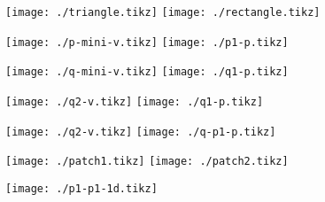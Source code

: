 \documentclass{article}
\begin{document}
\texttt{[image: ./triangle.tikz]}
\texttt{[image: ./rectangle.tikz]}

\texttt{[image: ./p-mini-v.tikz]}
\texttt{[image: ./p1-p.tikz]}

\texttt{[image: ./q-mini-v.tikz]}
\texttt{[image: ./q1-p.tikz]}

\texttt{[image: ./q2-v.tikz]}
\texttt{[image: ./q1-p.tikz]}

\texttt{[image: ./q2-v.tikz]}
\texttt{[image: ./q-p1-p.tikz]}

\texttt{[image: ./patch1.tikz]}
\texttt{[image: ./patch2.tikz]}

\texttt{[image: ./p1-p1-1d.tikz]}
\end{document}
